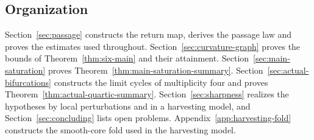 \subsection{Organization}

Section~\ref{sec:passage} constructs the return map, derives the passage law
and proves the estimates used throughout. Section~\ref{sec:curvature-graph}
proves the bounds of Theorem~\ref{thm:six-main} and their attainment.
Section~\ref{sec:main-saturation} proves
Theorem~\ref{thm:main-saturation-summary}. Section~\ref{sec:actual-bifurcations}
constructs the limit cycles of multiplicity four and proves
Theorem~\ref{thm:actual-quartic-summary}. Section~\ref{sec:sharpness} realizes
the hypotheses by local perturbations and in a harvesting model, and
Section~\ref{sec:concluding} lists open problems.
Appendix~\ref{app:harvesting-fold} constructs the smooth-core fold used in the
harvesting model.
